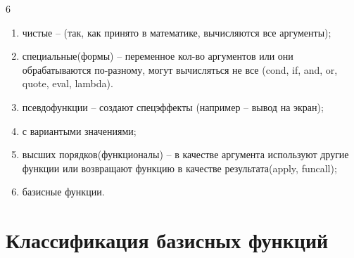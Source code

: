 \begin{listbox}{\noindent \begin{listboxtitle}{}6\end{listboxtitle}}
\begin{enumerate}
	\item чистые -- (так, как принято в математике, вычисляются все аргументы);
	\item специальные(формы) -- переменное кол-во аргументов или они обрабатываются 
    по-разному, могут вычисляться не все (cond, if, and, or, quote, eval, lambda).
	\item псевдофункции -- создают спецэффекты (например -- вывод на экран);
	\item с вариантыми значениями;
	\item высших порядков(функционалы) -- в качестве аргумента используют другие 
    функции или возвращают функцию в качестве результата(apply, funcall);
    \item базисные функции.
\end{enumerate}
\end{listbox}

\section{Классификация базисных функций}

